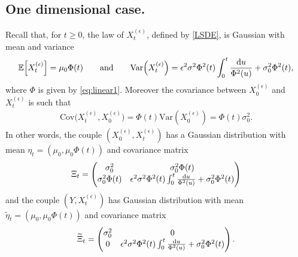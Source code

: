 \documentclass[12pt,thmsa]{article}
\begin{document}
\subsection{One dimensional case.} 
Recall that, for $t\ge 0$, the law of $X^{(\epsilon)}_t$, defined by \eqref{LSDE}, is Gaussian with  mean and variance
\[
\mathbb{E}\Big[X^{(\epsilon)}_t\Big]=\mu_0\Phi(t)\qquad \textrm{and}\qquad \mathrm{Var}\Big(X^{(\epsilon)}_t\Big)=\epsilon^2\sigma^2\Phi^2(t)\int_0^{ t}\frac{{\rm d}u}{\Phi^2(u)}+\sigma_0^2\Phi^2(t),
\]
where $\Phi$ is given by \eqref{eq:linear1}. Moreover the covariance between $X^{(\epsilon)}_0$ and $X^{(\epsilon)}_t$ is such that
\[
\begin{split}
	\mathrm{Cov}\Big(X^{(\epsilon)}_t, X^{(\epsilon)}_0\Big)=\Phi(t)\mathrm{Var}(X^{(\epsilon)}_0)=\Phi(t)\sigma^2_0.
\end{split}
\]
In other words, the couple $(X^{(\epsilon)}_0, X^{(\epsilon)}_t)$  has a Gaussian distribution with mean  $\eta_t=(\mu_0, \mu_0\Phi(t))$ and covariance matrix
\[
\Xi_t=\begin{pmatrix}
	\sigma_0^2 & \sigma_0^2\Phi(t)\\
	\sigma_0^2\Phi(t) & \epsilon^2\sigma^2\Phi^2(t)\int_0^{ t}\frac{{\rm d}u}{\Phi^2(u)}+\sigma_0^2\Phi^2(t)
\end{pmatrix}
\]
and the couple $(Y, X^{(\epsilon)}_t)$ has Gaussian distribution with mean   $\widetilde{\eta}_t=(\mu_0, \mu_0\Phi(t))$ and covariance matrix
\[
\widetilde{\Xi}_t=\begin{pmatrix}
	\sigma_0^2 & 0\\
	0 & \epsilon^2\sigma^2\Phi^2(t)\int_0^{ t}\frac{{\rm d}u}{\Phi^2(u)}+\sigma_0^2\Phi^2(t)
\end{pmatrix} .
\]
\end{document}
